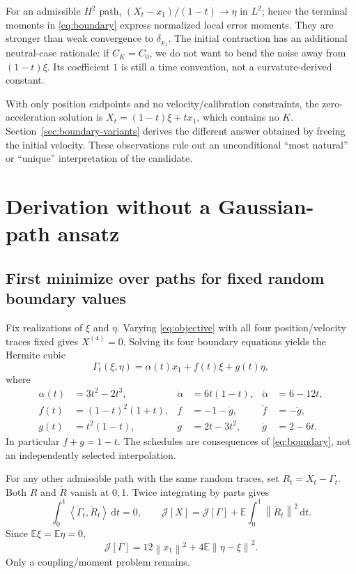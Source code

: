 \documentclass[11pt,letterpaper]{article}
\newcommand{\E}{\mathbb E}
\newcommand{\dd}{\,\mathrm d}
\newcommand{\norm}[1]{\left\lVert#1\right\rVert}
\newcommand{\ip}[2]{\left\langle#1,#2\right\rangle}
\newcommand{\J}{\mathcal J}
\begin{document}
For an admissible $H^2$ path, $(X_t-x_1)/(1-t)\to\eta$ in $L^2$; hence the terminal moments in \eqref{eq:boundary} express normalized local error moments. They are stronger than weak convergence to $\delta_{x_1}$. The initial contraction has an additional neutral-case rationale: if $C_K=C_0$, we do not want to bend the noise away from $(1-t)\xi$. Its coefficient $1$ is still a time convention, not a curvature-derived constant.

With only position endpoints and no velocity/calibration constraints, the zero-acceleration solution is $X_t=(1-t)\xi+tx_1$, which contains no $K$. Section~\ref{sec:boundary-variants} derives the different answer obtained by freeing the initial velocity. These observations rule out an unconditional ``most natural'' or ``unique'' interpretation of the candidate.

\section{Derivation without a Gaussian-path ansatz}
\label{sec:derive}

\subsection{First minimize over paths for fixed random boundary values}
Fix realizations of $\xi$ and $\eta$. Varying \eqref{eq:objective} with all four position/velocity traces fixed gives $X^{(4)}=0$. Solving its four boundary equations yields the Hermite cubic
\begin{equation}
\Gamma_t(\xi,\eta)=\alpha(t)x_1+f(t)\xi+g(t)\eta,
\label{eq:hermite}
\end{equation}
where
\begin{equation}
\boxed{\begin{aligned}
\alpha(t)&=3t^2-2t^3,&\dot\alpha&=6t(1-t),&\ddot\alpha&=6-12t,\\
f(t)&=(1-t)^2(1+t),&\dot f&=-1-\dot g,&\ddot f&=-\ddot g,\\
g(t)&=t^2(1-t),&\dot g&=2t-3t^2,&\ddot g&=2-6t.
\end{aligned}}
\label{eq:schedules}
\end{equation}
In particular $f+g=1-t$. The schedules are consequences of \eqref{eq:boundary}, not an independently selected interpolation.

For any other admissible path with the same random traces, set $R_t=X_t-\Gamma_t$. Both $R$ and $\dot R$ vanish at $0,1$. Twice integrating by parts gives
\begin{equation}
\int_0^1\ip{\ddot\Gamma_t}{\ddot R_t}\dd t=0,\qquad
\J[X]=\J[\Gamma]+\E\int_0^1\norm{\ddot R_t}^2\dd t.
\label{eq:orthogonality}
\end{equation}
Since $\E\xi=\E\eta=0$,
\begin{equation}
\J[\Gamma]=12\norm{x_1}^2+4\E\norm{\eta-\xi}^2.
\label{eq:reduced}
\end{equation}
Only a coupling/moment problem remains.
\end{document}
